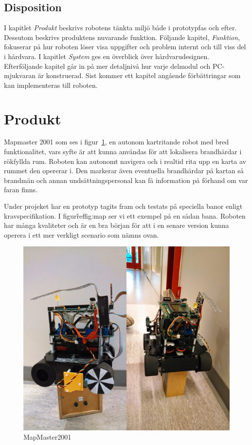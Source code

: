 \documentclass[a4paper,12pt,fleqn]{article}
\begin{document}
\subsection{Disposition}
I kapitlet \emph{Produkt} beskrivs robotens tänkta miljö både i prototypfas och efter. Dessutom beskrivs produktens nuvarande funktion. Följande kapitel, \emph{Funktion}, fokuserar på hur roboten löser visa uppgifter och problem internt och till viss del i hårdvara. I kapitlet \emph{System} ges en överblick över hårdvarudesignen. Efterföljande kapitel går in på mer detaljnivå hur varje delmodul och PC-mjukvaran är konstruerad. Sist kommer ett kapitel angående förbättringar som kan implementeras till roboten.

\newpage
\section{Produkt}

Mapmaster 2001 som ses i figur~\ref{fig:robot}, en autonom kartritande robot med bred funktionalitet, vars syfte är att kunna användas för att lokalisera brandhärdar i rökfyllda rum. Roboten kan autonomt navigera och i realtid rita upp en karta av rummet den opererar i. Den markerar även eventuella brandhärdar på kartan så brandmän och annan undsättningspersonal kan få information på förhand om var faran finns. 

Under projeket har en prototyp tagits fram och testats på speciella banor enligt kravspecifikation. I figur\~ref{fig:map} ser vi ett exempel på en sådan bana. Roboten har många kvaliteter och är en bra början för att i en senare version kunna operera i ett mer verkligt scenario som nämns ovan. 

\begin{figure}[htp] %
  \begin{center}
  \includegraphics[keepaspectratio=true,width=0.4\linewidth]{../Kappa/robot.png}  %
  \end{center}
  \caption{MapMaster2001} %
  \label{fig:robot}
\end{figure}
\end{document}
